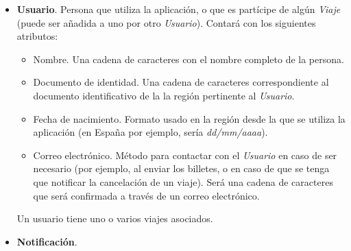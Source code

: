 \begin{itemize}
    \item \textbf{Usuario}. Persona que utiliza la aplicación, o que es partícipe de algún \textit{Viaje} (puede ser
        añadida a uno por otro \textit{Usuario}). Contará con los siguientes atributos:
        \begin{itemize}
            \item Nombre. Una cadena de caracteres con el nombre completo de la persona.
            \item Documento de identidad. Una cadena de caracteres correspondiente al documento identificativo de la
                la región pertinente al \textit{Usuario}.
            \item Fecha de nacimiento. Formato usado en la región desde la que se utiliza la aplicación (en España por ejemplo,
                sería \textit{dd/mm/aaaa}).
            \item Correo electrónico. Método para contactar con el \textit{Usuario} en caso de ser necesario (por ejemplo, al
                enviar los billetes, o en caso de que se tenga que notificar la cancelación de un viaje). Será una cadena de
                caracteres que será confirmada a través de un correo electrónico.
        \end{itemize}
        Un usuario tiene uno o varios viajes asociados.

    \item \textbf{Notificación}. 

\end{itemize}
